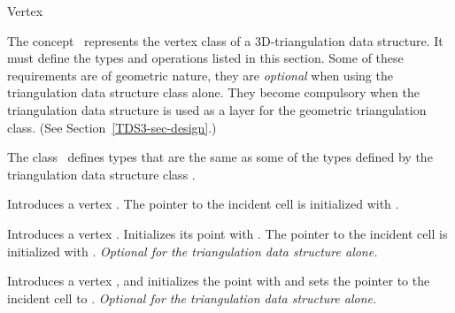 

\begin{ccRefConcept}[TriangulationDataStructure_3::]{Vertex}


\ccDefinition
  
The concept \ccRefName\ represents the vertex class of a 3D-triangulation data structure. It must define
the types and operations listed in this section. Some of these
requirements are of geometric nature, they are \textit{optional}
when using the triangulation data structure class alone. They become
compulsory when the triangulation data structure is used as a layer
for the geometric triangulation class. (See Section~\ref{TDS3-sec-design}.)

\ccTypes
{}
\ccThreeToTwo
{} 

The class \ccClassName\ defines types that are the same as some of the 
types defined by the triangulation data structure class .

\ccGlue
{}

\ccCreation
{}  %

{Introduces a vertex \ccVar. 
The pointer to the incident cell is initialized with .}

{Introduces a vertex \ccVar. Initializes its point with .
The pointer to the incident cell is initialized with
. {\textit{Optional for the triangulation data structure alone.}}}

{Introduces a vertex \ccVar, and initializes the point with 
and sets the pointer to the incident cell to . {\textit{Optional for the
triangulation data structure alone.}}}


\end{ccRefConcept}
